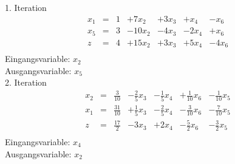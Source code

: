\documentclass[a4paper]{scrartcl}
\begin{document}
\begin{enumerate}
        1. Iteration
        \begin{equation}
            \begin{array}{rcrrrrr}
                x_1 & = & 1 & +7x_2 & +3x_3 & +x_4 & -x_6 \\
                x_5 & = & 3 & -10x_2 & -4x_3 & -2x_4 & +x_6 \\
                \hline
                z   & = & 4 & +15x_2 & +3x_3 & +5x_4 & -4x_6 \\
            \end{array}
        \end{equation}
        Eingangsvariable: $x_2$ \\
        Ausgangsvariable: $x_5$ \\

        2. Iteration
        \begin{equation}
            \begin{array}{rcrrrrr}
                x_2 & = & \frac{3}{10} & -\frac{2}{5}x_3 & -\frac{1}{5}x_4 & +\frac{1}{10}x_6 & -\frac{1}{10}x_5 \\
                x_1 & = & \frac{31}{10} & +\frac{1}{5}x_3 & -\frac{2}{5}x_4 & -\frac{3}{10}x_6 & -\frac{7}{10}x_5 \\
                \hline
                z   & = & \frac{17}{2} & -3x_3 & +2x_4 & -\frac{5}{2}x_6 & -\frac{3}{2}x_5 \\
            \end{array}
        \end{equation}
        Eingangsvariable: $x_4$ \\
        Ausgangsvariable: $x_2$ \\


\end{enumerate}
\end{document}

